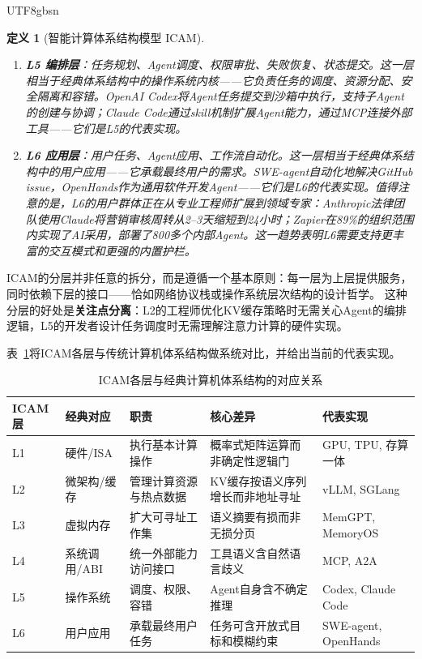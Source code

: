 \documentclass[11pt,a4paper]{article}
\newtheorem{definition}{定义}[section]
\begin{document}
\begin{CJK*}{UTF8}{gbsn}
\begin{definition}[智能计算体系结构模型 ICAM]
\begin{enumerate}[nosep]
\item \textbf{L5 编排层}：任务规划、Agent调度、权限审批、失败恢复、状态提交。这一层相当于经典体系结构中的操作系统内核——它负责任务的调度、资源分配、安全隔离和容错。OpenAI Codex将Agent任务提交到沙箱中执行，支持子Agent的创建与协调\cite{openai_codex_overview_2026,openai_codex_subagents_2026}；Claude Code通过skill机制扩展Agent能力，通过MCP连接外部工具\cite{anthropic_claudecode_overview_2026,anthropic_claudecode_skills_2026}——它们是L5的代表实现。

\item \textbf{L6 应用层}：用户任务、Agent应用、工作流自动化。这一层相当于经典体系结构中的用户应用——它承载最终用户的需求。SWE-agent自动化地解决GitHub issue\cite{sweagent2024}，OpenHands作为通用软件开发Agent\cite{openhands_paper_2025}——它们是L6的代表实现。值得注意的是，L6的用户群体正在从专业工程师扩展到领域专家：Anthropic法律团队使用Claude将营销审核周转从2--3天缩短到24小时；Zapier在89\%的组织范围内实现了AI采用，部署了800多个内部Agent\cite{anthropic2026agenticreport}。这一趋势表明L6需要支持更丰富的交互模式和更强的内置护栏。
\end{enumerate}
\end{definition}

ICAM的分层并非任意的拆分，而是遵循一个基本原则：每一层为上层提供服务，同时依赖下层的接口——恰如网络协议栈或操作系统层次结构的设计哲学。
这种分层的好处是\textbf{关注点分离}：L2的工程师优化KV缓存策略时无需关心Agent的编排逻辑，L5的开发者设计任务调度时无需理解注意力计算的硬件实现。

表~\ref{tab:icam}将ICAM各层与传统计算机体系结构做系统对比，并给出当前的代表实现。

\begin{table}[t]
\centering
\footnotesize
\caption{ICAM各层与经典计算机体系结构的对应关系}
\label{tab:icam}
\begin{tabularx}{\textwidth}{p{}p{}p{}p{}p{}}
\toprule
ICAM层 & 经典对应 & 职责 & 核心差异 & 代表实现 \\
\midrule
L1 & 硬件/ISA & 执行基本计算操作 & 概率式矩阵运算而非确定性逻辑门 & GPU, TPU, 存算一体\cite{wolters2024computeinmemory} \\
L2 & 微架构/缓存 & 管理计算资源与热点数据 & KV缓存按语义序列增长而非地址寻址 & vLLM, SGLang\cite{kwon2023pagedattention,sglang2024} \\
L3 & 虚拟内存 & 扩大可寻址工作集 & 语义摘要有损而非无损分页 & MemGPT, MemoryOS\cite{memgpt2023,memoryos2025} \\
L4 & 系统调用/ABI & 统一外部能力访问接口 & 工具语义含自然语言歧义 & MCP, A2A\cite{mcp_intro_2026,agentprotocols2025} \\
L5 & 操作系统 & 调度、权限、容错 & Agent自身含不确定推理 & Codex, Claude Code\cite{openai_codex_overview_2026,anthropic_claudecode_overview_2026} \\
L6 & 用户应用 & 承载最终用户任务 & 任务可含开放式目标和模糊约束 & SWE-agent, OpenHands\cite{sweagent2024,openhands_paper_2025} \\
\bottomrule
\end{tabularx}
\end{table}


\end{CJK*}
\end{document}
